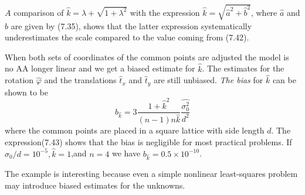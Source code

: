 $A$ comparison of $\hat{k} = \lambda + \sqrt{1 + \lambda^2}$ with the expression $\hat{k} = \sqrt{\hat{a}^2 + \hat{b}^2}$, where $\hat{a}$ and $\hat{b}$ are given by (7.35), shows that the latter expression systematically underestimates the scale compared to the value coming from (7.42).
\par
When both sets of coordinates of the common points are adjusted the model is no
AA longer linear and we get a biased estimate for $\hat{k}$. The estimates for the rotation $\hat{\varphi}$ and the translations $\hat{t}_x$  and $\hat{t}_y$  are still unbiased. \emph{The bias} for $\hat{k}$  can be shown to be
\begin{equation}
b_{\hat{k}}
= 3\frac{1 + \hat{k}^2}{(n - 1)n\hat{k}}\frac{\hat{\sigma_{0}^{2}}}{d^2}
\end{equation}
where the common points are placed in a square lattice with side length $d$. The expression(7.43) shows that the bias is negligible for most practical problems. If $\hat{\sigma}_0/d = 10^{-5},\hat{k} = 1$,and $n = 4$ we have $b_{\hat{k}} = 0.5 \times 10^{-10}$.
\par
The example is interesting because even a simple nonlinear least-squares problem
may introduce biased estimates for the unknowns.